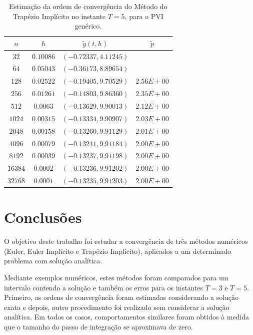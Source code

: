 \documentclass[twocolumn,amsmath,amssymb,floatfix]{revtex4}
\begin{document}
\begin{table}[H]
 \centering
 \begin{tabular}{ c|c|c|c }
  \hline
  \hline
  $n$  & $h$  & $\tilde{y}(t,h)$ & $\tilde{p}$ \\
  \hline
  \hline
$32$&$0.10086$&	$    (  -0.72337,    4.11245)$ &	$ $ \\
\hline
$64$&$0.05043$&$    (  -0.36173,    8.89654)$&$ $\\
\hline
$128$&$0.02522	 $&$    (  -0.19405,    9.70529)	$&$2.56E+00$\\
\hline
$256$&$0.01261	 $&$   (  -0.14803,    9.86360)	$&$2.35E+00$\\
\hline
$512$&$0.0063	 $&$    (  -0.13629,    9.90013)	$&$2.12E+00$\\
\hline
$1024$&$0.00315	 $&$    (  -0.13334,    9.90907)	$&$2.03E+00$\\
\hline
$2048$&$0.00158	 $&$    (  -0.13260,    9.91129)	$&$2.01E+00$\\
\hline
$4096$&$0.00079	 $&$    (  -0.13241,    9.91184)	$&$2.00E+00$\\
\hline
$8192$&$0.00039	 $&$    (  -0.13237,    9.91198)	$&$2.00E+00$\\
\hline
$16384$&$0.0002	 $&$    (  -0.13236,    9.91202)	$&$2.00E+00$\\
\hline
$32768$&$0.0001	 $&$   (  -0.13235,    9.91203)	$&$2.00E+00$\\
  \hline
  \hline
 \end{tabular}
   \caption{Estimação da ordem de convergência do Método do Trapézio Implícito no instante $T=5$, para o PVI genérico.} \label{tab:c2m3t5}
\end{table}

\section{Conclusões}
O objetivo deste trabalho foi estudar a convergência de três métodos numéricos (Euler, Euler Implícito e Trapézio Implícito), aplicados a um determinado problema com solução analítica.

Mediante exemplos numéricos, estes métodos foram comparados para um intervalo contendo a solução e também os erros para os instantes $T=3$ e $T=5$. Primeiro, as ordens de convergência foram estimadas considerando a solução exata e depois, outro procedimento foi realizado sem considerar a solução analítica. Em todos os casos, comportamentos similares foram obtidos à medida que o tamanho do passo de integração se aproximava de zero.

\newpage



\end{document}
